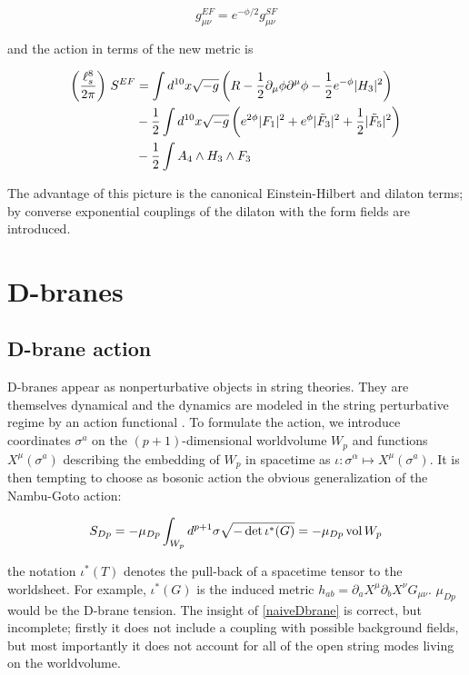 \begin{equation}
	g_{\mu\nu}^{EF} = e^{-\phi/2} g_{\mu\nu}^{SF}
	\label{}
\end{equation}

and the action in terms of the new metric is \cite{BBS}

\begin{align}
\begin{split}
	\left(\frac{\ell_s^8}{2\pi}\right) \,S^{EF} &=  \int d^{10} x \sqrt{-g} \left( R - \frac{1}{2} \partial_\mu \phi \partial^\mu \phi - \frac{1}{2} e^{-\phi} |H_3|^2 \right)\\
	&- \frac{1}{2}  \int d^{10}x \sqrt{-g} \left( e^{2\phi} |F_1|^2 + e^\phi |\tilde F_3|^2 + \frac{1}{2} |\tilde F_5|^2 \right)\\
	&- \frac{1}{2}  \int A_4 \wedge H_3 \wedge F_3 
	\label{}
\end{split}
\end{align}

The advantage of this picture is the canonical Einstein-Hilbert and dilaton terms; by converse exponential couplings of the dilaton with the form fields are introduced.

\section{D-branes}

\subsection{D-brane action}

D-branes appear as nonperturbative objects in string theories. They are themselves dynamical and the dynamics are modeled in the string perturbative regime by an action functional \cite{ibanezU}. To formulate the action, we introduce coordinates $\sigma^a$ on the $(p+1)$-dimensional worldvolume $W_p$ and functions $X^\mu(\sigma^a)$ describing the embedding of $W_p$ in spacetime as $\iota:\sigma^\alpha \mapsto X^\mu(\sigma^a)$. It is then tempting to choose as bosonic action the obvious generalization of the Nambu-Goto action:

\begin{equation}
	S_{Dp} = - \mu_{Dp} \int_{W_p} d^{p+1} \sigma \sqrt{-\det \iota^*(G)} = - \mu_{Dp} \operatorname{vol} W_p
	\label{naiveDbrane}
\end{equation}

the notation $\iota^*(T)$ denotes the pull-back of a spacetime tensor to the worldsheet. For example, $\iota^*(G)$ is the induced metric $h_{ab} = \partial_a X^\mu \partial_b X^\nu G_{\mu\nu}$. $\mu_{Dp}$ would be the D-brane tension. The insight of \eqref{naiveDbrane} is correct, but incomplete; firstly it does not include a coupling with possible background fields, but most importantly it does not account for all of the open string modes living on the worldvolume.

